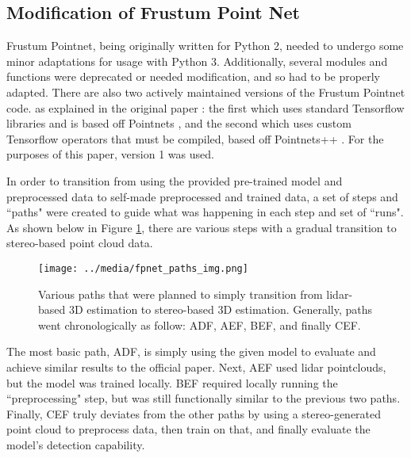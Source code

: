 \subsection{Modification of Frustum Point Net}
Frustum Pointnet, being originally written for Python 2, needed to undergo some minor adaptations for usage with Python 3. Additionally, several modules and functions were deprecated or needed modification, and so had to be properly adapted. There are also two actively maintained versions of the Frustum Pointnet code. as explained in the original paper \cite{qi_frustum_2017}: the first which uses standard Tensorflow libraries and is based off Pointnets \cite{qi_pointnet:_2017}, and the second which uses custom Tensorflow operators that must be compiled, based off Pointnets++ \cite{qi_pointnet++:_2017}. For the purposes of this paper, version 1 was used.

In order to transition from using the provided pre-trained model and preprocessed data to self-made preprocessed and trained data, a set of steps and ``paths" were created to guide what was happening in each step and set of ``runs". As shown below in Figure \ref{fp_paths}, there are various steps with a gradual transition to stereo-based point cloud data.

\begin{figure}[H]
    \centering
    \texttt{[image: ../media/fpnet\_paths\_img.png]}
    \caption{Various paths that were planned to simply transition from lidar-based 3D estimation to stereo-based 3D estimation. Generally, paths went chronologically as follow: ADF, AEF, BEF, and finally CEF.}
    \label{fp_paths}
\end{figure}

The most basic path, ADF, is simply using the given model to evaluate and achieve similar results to the official paper. Next, AEF used lidar pointclouds, but the model was trained locally. BEF required locally running the ``preprocessing" step, but was still functionally similar to the previous two paths. Finally, CEF truly deviates from the other paths by using a stereo-generated point cloud to preprocess data, then train on that, and finally evaluate the model's detection capability.

\newpage
